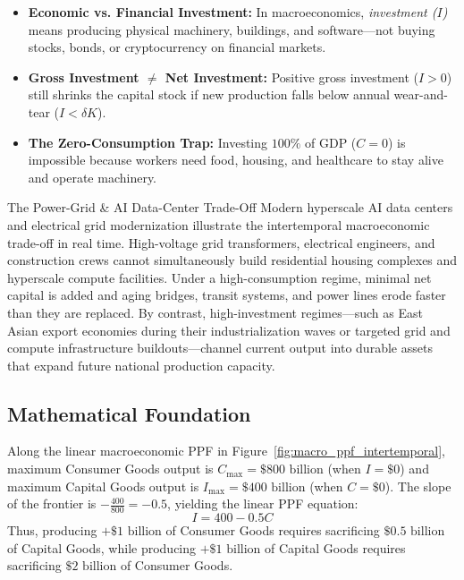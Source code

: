 \documentclass[11pt,letterpaper]{article}
\begin{document}
\begin{coreprinciple}
\begin{itemize}
  \item \textbf{Economic vs. Financial Investment:} In macroeconomics, \emph{investment ($I$)} means producing physical machinery, buildings, and software—not buying stocks, bonds, or cryptocurrency on financial markets.
  \item \textbf{Gross Investment $\neq$ Net Investment:} Positive gross investment ($I > 0$) still shrinks the capital stock if new production falls below annual wear-and-tear ($I < \delta K$).
  \item \textbf{The Zero-Consumption Trap:} Investing $100\%$ of GDP ($C = 0$) is impossible because workers need food, housing, and healthcare to stay alive and operate machinery.
\end{itemize}
\end{coreprinciple}

\begin{examplecase}{The Power-Grid \& AI Data-Center Trade-Off}
Modern hyperscale AI data centers and electrical grid modernization illustrate the intertemporal macroeconomic trade-off in real time. High-voltage grid transformers, electrical engineers, and construction crews cannot simultaneously build residential housing complexes and hyperscale compute facilities. Under a high-consumption regime, minimal net capital is added and aging bridges, transit systems, and power lines erode faster than they are replaced. By contrast, high-investment regimes—such as East Asian export economies during their industrialization waves or targeted grid and compute infrastructure buildouts—channel current output into durable assets that expand future national production capacity.
\end{examplecase}

\subsection*{Mathematical Foundation}
Along the linear macroeconomic PPF in Figure~\ref{fig:macro_ppf_intertemporal}, maximum Consumer Goods output is $C_{\max} = \$800\text{ billion}$ (when $I = \$0$) and maximum Capital Goods output is $I_{\max} = \$400\text{ billion}$ (when $C = \$0$). The slope of the frontier is $-\frac{400}{800} = -0.5$, yielding the linear PPF equation:
\begin{equation}
I = 400 - 0.5C
\end{equation}
Thus, producing $+\$1\text{ billion}$ of Consumer Goods requires sacrificing $\$0.5\text{ billion}$ of Capital Goods, while producing $+\$1\text{ billion}$ of Capital Goods requires sacrificing $\$2\text{ billion}$ of Consumer Goods.
\end{document}
